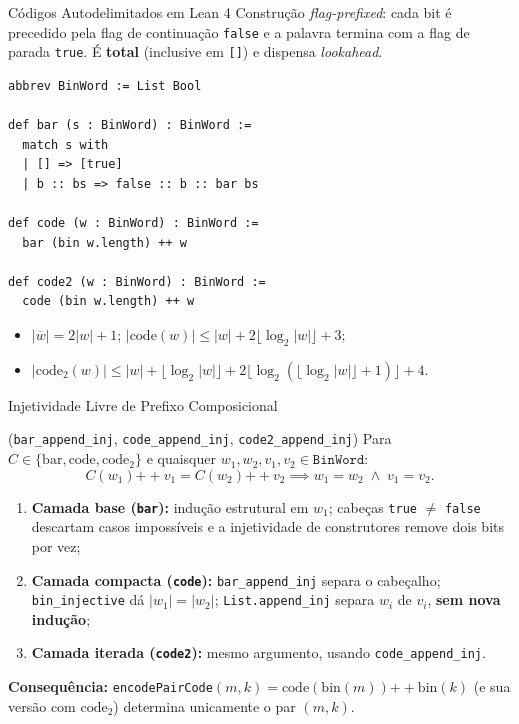 \documentclass[10pt, aspectratio=43]{beamer}
\begin{document}
\begin{frame}[fragile]{Códigos Autodelimitados em Lean 4}
\small
Construção \textit{flag-prefixed}: cada bit é precedido pela flag de continuação \texttt{false} e a palavra termina com a flag de parada \texttt{true}. É \textbf{total} (inclusive em \texttt{[]}) e dispensa \textit{lookahead}.
\begin{lstlisting}[language=Lean4]
abbrev BinWord := List Bool

def bar (s : BinWord) : BinWord :=
  match s with
  | [] => [true]
  | b :: bs => false :: b :: bar bs

def code (w : BinWord) : BinWord :=
  bar (bin w.length) ++ w

def code2 (w : BinWord) : BinWord :=
  code (bin w.length) ++ w
\end{lstlisting}
\begin{itemize}
    \item $|\overline{w}| = 2|w| + 1$; \quad $|\text{code}(w)| \le |w| + 2\lfloor\log_2|w|\rfloor + 3$;
    \item $|\text{code}_2(w)| \le |w| + \lfloor\log_2|w|\rfloor + 2\lfloor\log_2(\lfloor\log_2|w|\rfloor + 1)\rfloor + 4$.
\end{itemize}
\end{frame}

\begin{frame}{Injetividade Livre de Prefixo Composicional}
    \begin{tcolorbox}[pucbox, title=Teorema (Injetividade Livre de Prefixo)]
        \small (\texttt{bar\_append\_inj}, \texttt{code\_append\_inj}, \texttt{code2\_append\_inj}) Para $C \in \{\text{bar}, \text{code}, \text{code}_2\}$ e quaisquer $w_1, w_2, v_1, v_2 \in \texttt{BinWord}$:
        \begin{equation*}
            C(w_1) \mathbin{+\!+} v_1 = C(w_2) \mathbin{+\!+} v_2 \implies w_1 = w_2 \;\wedge\; v_1 = v_2.
        \end{equation*}
    \end{tcolorbox}
    \small
    \begin{enumerate}
        \item \textbf{Camada base (\texttt{bar}):} indução estrutural em $w_1$; cabeças \texttt{true} $\neq$ \texttt{false} descartam casos impossíveis e a injetividade de construtores remove dois bits por vez;
        \item \textbf{Camada compacta (\texttt{code}):} \texttt{bar\_append\_inj} separa o cabeçalho; \texttt{bin\_injective} dá $|w_1| = |w_2|$; \texttt{List.append\_inj} separa $w_i$ de $v_i$, \textbf{sem nova indução};
        \item \textbf{Camada iterada (\texttt{code2}):} mesmo argumento, usando \texttt{code\_append\_inj}.
    \end{enumerate}
    \footnotesize{\textbf{Consequência:} \texttt{encodePairCode}$(m,k) = \text{code}(\text{bin}(m)) \mathbin{+\!+} \text{bin}(k)$ (e sua versão com $\text{code}_2$) determina unicamente o par $(m, k)$.}
\end{frame}
\end{document}
